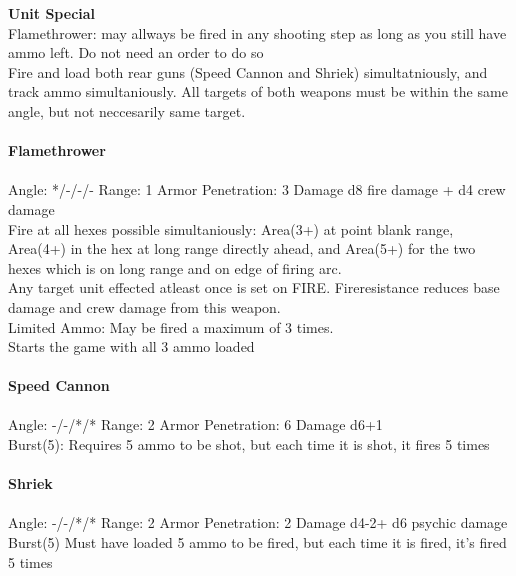 {\bf Unit Special} \\
Flamethrower: may allways be fired in any shooting step as long as you still have ammo left. Do not need an order to do so \\ Fire and load both rear guns (Speed Cannon and Shriek) simultatniously, and track ammo simultaniously. All targets of both weapons must be within the same angle, but not neccesarily same target.
\ \\
\ \\
{\bf Flamethrower } \\
\ \\
Angle: */-/-/- Range: 1 Armor Penetration: 3 Damage d8 fire damage + d4 crew damage \\
\indent Fire at all hexes possible simultaniously: Area(3+) at point blank range, Area(4+) in the hex at long range directly ahead, and Area(5+) for the two hexes which is on long range and on edge of firing arc. \\ Any target unit effected atleast once is set on FIRE. Fireresistance reduces base damage and crew damage from this weapon. \\ Limited Ammo: May be fired a maximum of 3 times. \\ Starts the game with all 3 ammo loaded \\



\ \\
{\bf Speed Cannon } \\
\ \\
Angle: -/-/*/* Range: 2 Armor Penetration: 6 Damage d6+1 \\
\indent Burst(5): Requires 5 ammo to be shot, but each time it is shot, it fires 5 times \\



\ \\
{\bf Shriek } \\
\ \\
Angle: -/-/*/* Range: 2 Armor Penetration: 2 Damage d4-2+ d6 psychic damage \\
\indent Burst(5) Must have loaded 5 ammo to be fired, but each time it is fired, it's fired 5 times \\





